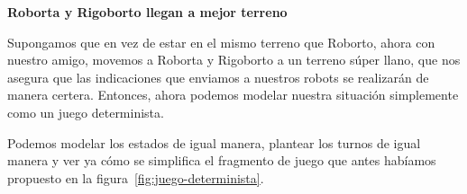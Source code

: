 



\textbf{Roborta y Rigoborto llegan a mejor terreno}

Supongamos que en vez de estar en el mismo terreno que Roborto, ahora con
nuestro amigo, movemos a Roborta y Rigoborto a un terreno súper llano, que nos
asegura que las indicaciones que enviamos a nuestros robots se realizarán de
manera certera. Entonces, ahora podemos modelar nuestra situación simplemente
como un juego determinista.

Podemos modelar los estados de igual manera, plantear los turnos de igual
manera y ver ya cómo se simplifica el fragmento de juego que antes habíamos
propuesto en la figura~\ref{fig:juego-determinista}.

